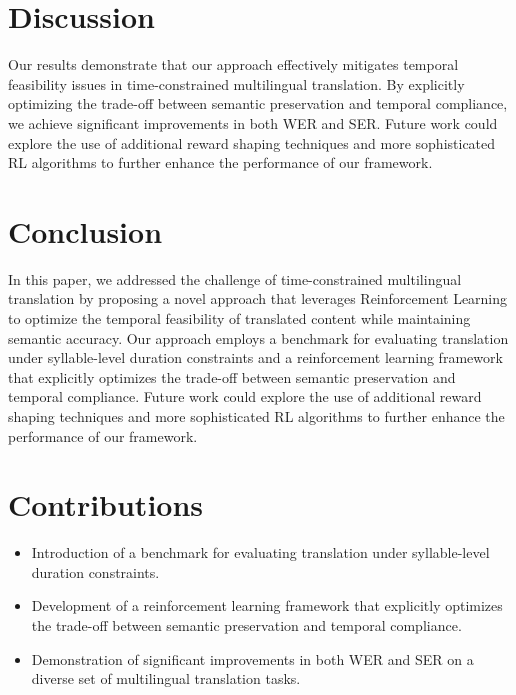 \documentclass{article}
\begin{document}
\section{Discussion}
Our results demonstrate that our approach effectively mitigates temporal feasibility issues in time-constrained multilingual translation. By explicitly optimizing the trade-off between semantic preservation and temporal compliance, we achieve significant improvements in both WER and SER. Future work could explore the use of additional reward shaping techniques and more sophisticated RL algorithms to further enhance the performance of our framework.

\section{Conclusion}
In this paper, we addressed the challenge of time-constrained multilingual translation by proposing a novel approach that leverages Reinforcement Learning to optimize the temporal feasibility of translated content while maintaining semantic accuracy. Our approach employs a benchmark for evaluating translation under syllable-level duration constraints and a reinforcement learning framework that explicitly optimizes the trade-off between semantic preservation and temporal compliance. Future work could explore the use of additional reward shaping techniques and more sophisticated RL algorithms to further enhance the performance of our framework.

\section{Contributions}
\begin{itemize}
    \item Introduction of a benchmark for evaluating translation under syllable-level duration constraints.
    \item Development of a reinforcement learning framework that explicitly optimizes the trade-off between semantic preservation and temporal compliance.
    \item Demonstration of significant improvements in both WER and SER on a diverse set of multilingual translation tasks.
\end{itemize}
\end{document}
